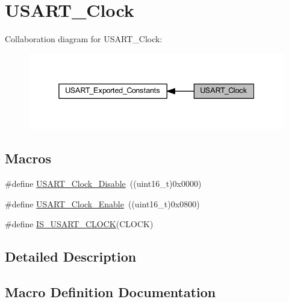 \hypertarget{group___u_s_a_r_t___clock}{}\section{U\+S\+A\+R\+T\+\_\+\+Clock}
\label{group___u_s_a_r_t___clock}
Collaboration diagram for U\+S\+A\+R\+T\+\_\+\+Clock\+:
\nopagebreak
\begin{figure}[H]
\begin{center}
\leavevmode
\includegraphics[width=338pt]{group___u_s_a_r_t___clock}
\end{center}
\end{figure}
\subsection*{Macros}
\begin{DoxyCompactItemize}
\item 
\#define \hyperlink{group___u_s_a_r_t___clock_ga56c12b81d19853c093e0a373d0c52fb5}{U\+S\+A\+R\+T\+\_\+\+Clock\+\_\+\+Disable}~((uint16\+\_\+t)0x0000)
\item 
\#define \hyperlink{group___u_s_a_r_t___clock_gacfe029e2ec4f49ddde031fd031654caa}{U\+S\+A\+R\+T\+\_\+\+Clock\+\_\+\+Enable}~((uint16\+\_\+t)0x0800)
\item 
\#define \hyperlink{group___u_s_a_r_t___clock_ga0f1e1ba37690b21b7338ed3b06614cf6}{I\+S\+\_\+\+U\+S\+A\+R\+T\+\_\+\+C\+L\+O\+CK}(C\+L\+O\+CK)
\end{DoxyCompactItemize}


\subsection{Detailed Description}


\subsection{Macro Definition Documentation}
\mbox{\label{group___u_s_a_r_t___clock_ga0f1e1ba37690b21b7338ed3b06614cf6}} 
